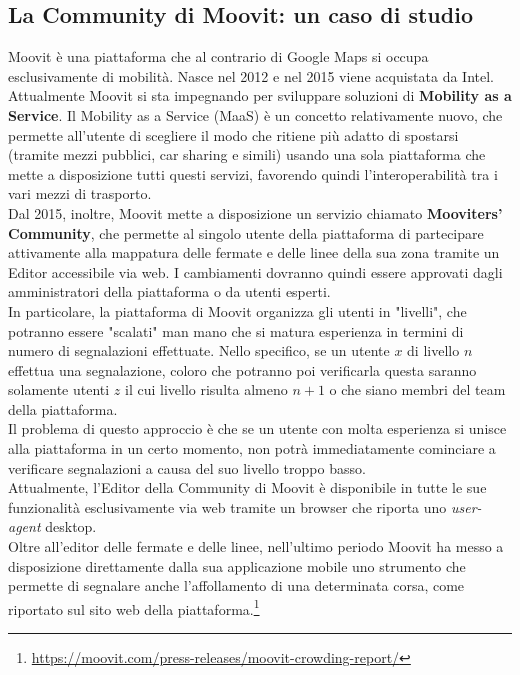     \subsection{La Community di Moovit: un caso di studio}
        Moovit è una piattaforma che al contrario di Google Maps si occupa esclusivamente di mobilità.
        Nasce nel 2012 e nel 2015 viene acquistata da Intel. Attualmente Moovit si sta impegnando per sviluppare soluzioni di \textbf{Mobility as a Service}.
        Il Mobility as a Service (MaaS) è un concetto relativamente nuovo, che permette all'utente di scegliere il modo che ritiene più adatto di spostarsi (tramite mezzi pubblici, car sharing e simili) usando una sola piattaforma che mette a disposizione tutti questi servizi, favorendo quindi l'interoperabilità tra i vari mezzi di trasporto. \\

        Dal 2015, inoltre, Moovit mette a disposizione un servizio chiamato \textbf{Mooviters' Community}, che permette al singolo utente della piattaforma di partecipare attivamente alla mappatura delle fermate e delle linee della sua zona tramite un Editor accessibile via web. I cambiamenti dovranno quindi essere approvati dagli amministratori della piattaforma o da utenti esperti. \\

        In particolare, la piattaforma di Moovit organizza gli utenti in "livelli", che potranno essere "scalati" man mano che si matura esperienza in termini di numero di segnalazioni effettuate. Nello specifico, se un utente $x$ di livello $n$ effettua una segnalazione, coloro che potranno poi verificarla questa saranno solamente utenti $z$ il cui livello risulta almeno $n + 1$ o che siano membri del team della piattaforma. \\
        Il problema di questo approccio è che se un utente con molta esperienza si unisce alla piattaforma in un certo momento, non potrà immediatamente cominciare a verificare segnalazioni a causa del suo livello troppo basso.\\
        Attualmente, l'Editor della Community di Moovit è disponibile in tutte le sue funzionalità esclusivamente via web tramite un browser che riporta uno \textit{user-agent} desktop. \\

        Oltre all'editor delle fermate e delle linee, nell'ultimo periodo Moovit ha messo a disposizione direttamente dalla sua applicazione mobile uno strumento che permette di segnalare anche l'affollamento di una determinata corsa, come riportato sul sito web della piattaforma.\footnote[3]{\url{https://moovit.com/press-releases/moovit-crowding-report/}}

